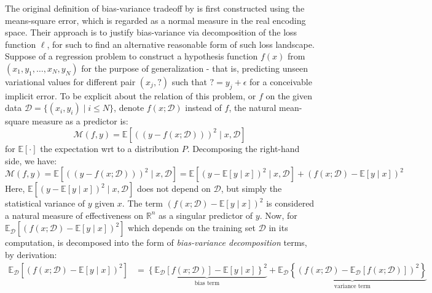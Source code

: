 \documentclass[10pt]{article} %
\begin{document}
The original definition of bias-variance tradeoff by \cite{6797087} is first constructed using the means-square error, which is regarded as a normal measure in the real encoding space. Their approach is to justify bias-variance via decomposition of the loss function $\ell$, for such to find an alternative reasonable form of such loss landscape. Suppose of a regression problem to construct a hypothesis function $f(x)$ from $(x_{1},y_{1},\dots,x_{N},y_{N})$ for the purpose of generalization - that is, predicting unseen variational values for different pair $(x_{j}, \mathord{?})$ such that $\mathord{?}=y_{j}+\epsilon$ for a conceivable implicit error. To be explicit about the relation of this problem, or $f$ on the given data $\mathcal{D}=\{(x_i, y_i)\mid i \leq N\}$, denote $f(x;\mathcal{D})$ instead of $f$, the natural mean-square measure as a predictor is: 
\begin{equation}
    \mathcal{M}(f,y) = \mathbb{E} \left[((y-f(x;\mathcal{D})))^{2}\mid x, \mathcal{D}\right] 
\end{equation} for $\mathbb{E}[\cdot]$ the expectation wrt to a distribution $P$. Decomposing the right-hand side, we have: 
\begin{equation}
    \mathcal{M}(f,y) = \mathbb{E} \left[((y-f(x;\mathcal{D})))^{2}\mid x, \mathcal{D}\right] = \mathbb{E}\left[(y-\mathbb{E}[y\mid x])^{2}\mid x,\mathcal{D}\right] + (f(x;\mathcal{D})-\mathbb{E}[y\mid x])^{2}
\end{equation}
Here, $\mathbb{E}\left[(y-\mathbb{E}[y\mid x])^{2}\mid x,\mathcal{D}\right]$ does not depend on $\mathcal{D}$, but simply the statistical variance of $y$ given $x$. The term $(f(x;\mathcal{D})-\mathbb{E}[y\mid x])^{2}$ is considered a natural measure of effectiveness on $\mathbb{R}^{n}$ as a singular predictor of $y$. Now, for $\mathbb{E}_{\mathcal{D}}\left[(f(x;\mathcal{D})-\mathbb{E}[y\mid x])^{2}\right]$ which depends on the training set $\mathcal{D}$ in its computation, is decomposed into the form of \textit{bias-variance decomposition} terms, by derivation: 
\begin{equation}
    \begin{split}
        \mathbb{E}_{\mathcal{D}} \left[(f(x;\mathcal{D})-\mathbb{E}[y\mid x])^{2}\right] & = \underbrace{\left\{ \mathbb{E}_{\mathcal{D}}[f(x;\mathcal{D})] - \mathbb{E}[y\mid x] \right\}^{2}}_{\text{bias term}} + \underbrace{\mathbb{E}_{\mathcal{D}} \left\{(f(x;\mathcal{D})- \mathbb{E}_{\mathcal{D}}[f(x;\mathcal{D})])^{2}\right\}}_{\text{variance term}}
    \end{split}
\end{equation}
\end{document}
